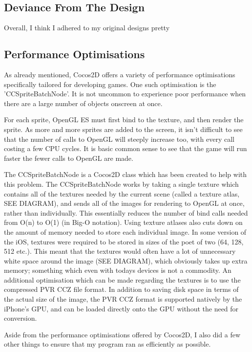 \documentclass[a4paper,oneside]{report}
\begin{document}
\subsection{Deviance From The Design} Overall, I think I adhered to my original designs pretty 

\subsection{Performance Optimisations} As already mentioned, Cocos2D offers a variety of performance optimisations specifically tailored for developing games. One such optimisation is the 'CCSpriteBatchNode'. It is not uncommon to experience poor performance when there are a large number of objects onscreen at once. 

For each sprite, OpenGL ES must first bind to the texture, and then render the sprite. As more and more sprites are added to the screen, it isn't difficult to see that the number of calls to OpenGL will steeply increase too, with every call costing a few CPU cycles. It is basic common sense to see that the game will run faster the fewer calls to OpenGL are made. 

The CCSpriteBatchNode is a Cocos2D class which has been created to help with this problem. The CCSpriteBatchNode works by taking a single texture which contains all of the textures needed by the current scene (called a texture atlas, SEE DIAGRAM), and sends all of the images for rendering to OpenGL at once, rather than individually. This essentially reduces the number of bind calls needed from O(n) to O(1) (in Big-O notation). Using texture atlases also cuts down on the amount of memory needed to store each individual image. In some version of the iOS, textures were required to be stored in sizes of the poet of two (64, 128, 512 etc.). This meant that the textures would often have a lot of unnecessary white space around the image (SEE DIAGRAM), which obviously takes up extra memory; something which even with todays devices is not a commodity. An additional optimisation which can be made regarding the textures is to use the 	compressed PVR CCZ file format. In addition to saving disk space in terms of the actual size of the image, the PVR CCZ format is supported natively by the iPhone's GPU, and can be loaded directly onto the GPU without the need for conversion.

Aside from the performance optimisations offered by Cocos2D, I also did a few other things to ensure that my program ran as efficiently as possible.
\end{document}
